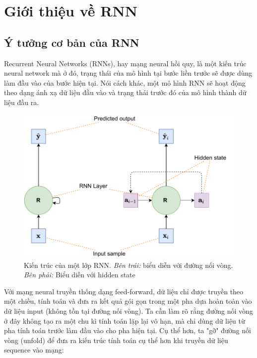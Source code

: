 
\section{Giới thiệu về RNN}

\subsection{Ý tưởng cơ bản của RNN}
Recurrent Neural Networks (RNNs), hay mạng neural hồi quy, là một kiến trúc neural network mà ở đó, trạng thái của mô hình tại bước liền trước sẽ được dùng làm đầu vào của bước hiện tại. Nói cách khác, một mô hình RNN sẽ hoạt động theo dạng ánh xạ dữ liệu đầu vào và trạng thái trước đó của mô hình thành dữ liệu đầu ra.

\begin{figure}[!h]
    \centering
    \includegraphics[width=\textwidth,height=\textheight,keepaspectratio]{chapter06/figure-sec2345/rnn.pdf}
    \caption{Kiến trúc của một lớp RNN. \emph{Bên trái:} biểu diễn với đường nối vòng. \emph{Bên phải:} Biểu diễn với hidden state}
\end{figure}

Với mạng neural truyền thống dạng feed-forward, dữ liệu chỉ được truyền theo một chiều, tính toán và đưa ra kết quả gói gọn trong một pha dựa hoàn toàn vào dữ liệu input (không tồn tại đường nối vòng). Ta cần làm rõ rằng đường nối vòng ở đây không tạo ra một chu kì tính toán lặp lại vô hạn, mà chỉ dùng dữ liệu từ pha tính toán trước làm đầu vào cho pha hiện tại. Cụ thể hơn, ta "gỡ" đường nối vòng (unfold) để đưa ra kiến trúc tính toán cụ thể hơn khi truyền dữ liệu sequence vào mạng:

